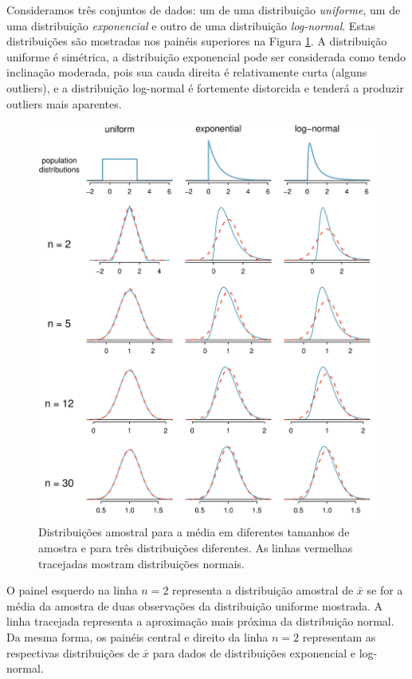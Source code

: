 \documentclass[
]{book}
\theoremstyle{definition}
\theoremstyle{definition}
\theoremstyle{definition}
\theoremstyle{definition}
\theoremstyle{remark}
\begin{document}
Consideramos três conjuntos de dados: um de uma distribuição \emph{uniforme}, um de uma distribuição \emph{exponencial} e outro de uma distribuição \emph{log-normal}. Estas distribuições são mostradas nos painéis superiores na Figura \ref{fig:cltSimulations}. A distribuição uniforme é simétrica, a distribuição exponencial pode ser considerada como tendo inclinação moderada, pois sua cauda direita é relativamente curta (alguns outliers), e a distribuição log-normal é fortemente distorcida e tenderá a produzir outliers mais aparentes.

\begin{figure}
\includegraphics[width=18.88in]{images/c4/cltSimulations} \caption{Distribuições amostral para a média em diferentes tamanhos de amostra e para três distribuições diferentes. As linhas vermelhas tracejadas mostram distribuições normais.}\label{fig:cltSimulations}
\end{figure}

O painel esquerdo na linha \(n = 2\) representa a distribuição amostral de \(\bar{x}\) se for a média da amostra de duas observações da distribuição uniforme mostrada. A linha tracejada representa a aproximação mais próxima da distribuição normal. Da mesma forma, os painéis central e direito da linha \(n = 2\) representam as respectivas distribuições de \(\bar{x}\) para dados de distribuições exponencial e log-normal.
\end{document}
